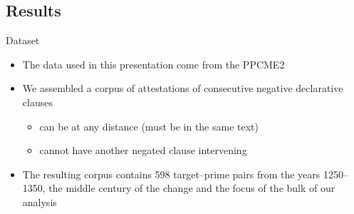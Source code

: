 \documentclass{digs-slides}
\begin{document}
\subsection{Results}

\begin{frame}{Dataset}
    \begin{itemize}
      \item The data used in this presentation come from the
        PPCME2 \parencite{Kroch2001}
      \item We assembled a corpus of attestations of consecutive
        negative declarative clauses
        \begin{itemize}
          \item can be at any distance (must be in the same text)
          \item cannot have another negated clause intervening
        \end{itemize}
      \item The resulting corpus contains 598 target–prime pairs from
        the years 1250–1350, the middle century of the change and the
        focus of the bulk of our analysis
    \end{itemize}
\end{frame}


\end{document}
